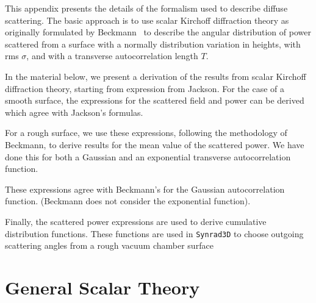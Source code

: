 \documentclass[11pt,openany]{report}
\newcommand{\srthree}{\texttt{Synrad3D}\xspace}
\begin{document}
{{This appendix presents the details of the formalism used to describe
diffuse scattering. The basic approach is to use scalar Kirchoff
diffraction theory as originally formulated by
Beckmann~\cite{b:beckmann} to describe the angular distribution of
power scattered from a surface with a normally distribution variation
in heights, with rms $\sigma$, and with a transverse autocorrelation
length $T$.

In the material below, we present a derivation of the results from
scalar Kirchoff diffraction theory, starting from expression from
Jackson. For the case of a smooth surface, the expressions for the
scattered field and power can be derived which agree with Jackson's
formulas.

For a rough surface, we use these expressions, following the
methodology of Beckmann, to derive results for the mean value of the
scattered power. We have done this for both a Gaussian and an
exponential transverse autocorrelation function.

These expressions agree with Beckmann's for the Gaussian
autocorrelation function. (Beckmann does not consider the exponential
function).

Finally, the scattered power expressions are used to derive cumulative
distribution functions. These functions are used in \srthree to choose
outgoing scattering angles from a rough vacuum chamber surface

\section{General Scalar Theory} 

}}
\end{document}
